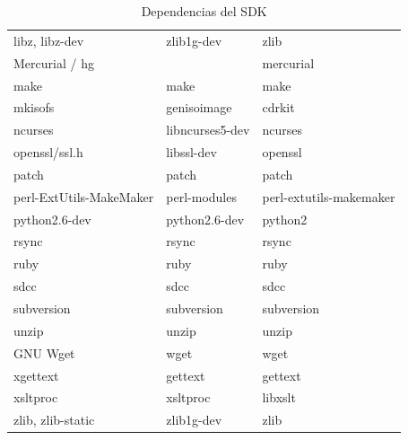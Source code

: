 \documentclass[12pt]{article}
\begin{document}
\begin{table}[!htbp]
{\begin{tabular}{|l|l|l|}
                    libz, libz-dev          & zlib1g-dev        & zlib                      \\
                    Mercurial / hg          &                   & mercurial                 \\
                    make                    & make              & make                      \\
                    mkisofs                 & genisoimage       & cdrkit                    \\
                    ncurses                 & libncurses5-dev   & ncurses                   \\
                    openssl/ssl.h           & libssl-dev        & openssl                   \\
                    patch                   & patch             & patch                     \\
                    perl-ExtUtils-MakeMaker & perl-modules      & perl-extutils-makemaker   \\
                    python2.6-dev           & python2.6-dev     & python2                   \\
                    rsync                   & rsync             & rsync                     \\
                    ruby                    & ruby              & ruby                      \\
                    sdcc                    & sdcc              & sdcc                      \\
                    subversion              & subversion        & subversion                \\
                    unzip                   & unzip             & unzip                     \\
                    GNU Wget                & wget              & wget                      \\
                    xgettext                & gettext           & gettext                   \\
                    xsltproc                & xsltproc          & libxslt                   \\
                    zlib, zlib-static       & zlib1g-dev        & zlib                      \\
                    \hline
                \end{tabular}
            }
        \caption{Dependencias del SDK}
        \label{tab:sdk_dependences}
    \end{table}
\end{document}
